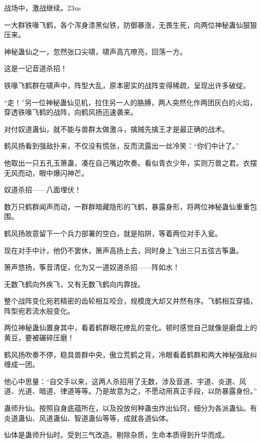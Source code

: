 
\begin{this_body}

战场中，激战继续。23us

一大群铁喙飞鹤，各个浑身漆黑似铁，防御暴涨，无畏生死，向两位神秘蛊仙狠狠压来。

神秘蛊仙之一，忽然张口尖啸，啸声高亢嘹亮，回荡一方。

这是一记音道杀招！

铁喙飞鹤群在啸声中，阵型大乱，原本密实的战阵变得稀疏，呈现出许多破绽。

“走！”另一位神秘蛊仙见机，拉住另一人的胳膊，两人突然化作两团灰白的火焰，穿透铁喙飞鹤的战阵，向鹤风扬迅速袭来。

对付奴道蛊仙，就不能与兽群太做激斗，擒贼先擒王才是最正确的战术。

鹤风扬看到强敌扑来，不仅没有慌张，反而流露出一丝冷笑：“你们中计了。”

他取出一只五孔玉箫蛊，凑在自己嘴边吹奏。看似青衣少年，实则万兽之君。衣摆无风而动，眼中爆闪神芒。

奴道杀招——八面埋伏！

数万只鹤群闻声而动，一群群暗藏隐形的飞鹤，暴露身形，将两位神秘蛊仙重重包围。

鹤风扬故意留下一个兵力部署的空白，就是陷阱，等着两位对手入瓮。

现在对手中计，他仍不罢休，箫声高扬上去，同时身上飞出三只五弦古筝蛊。

箫声悠扬，筝音清促，化为又一道奴道杀招——阵如水！

无数飞鹤向外疾飞，又有无数飞鹤向内靠拢。

整个战阵变化宛若精密的齿轮相互咬合，规模庞大却又井然有序。飞鹤相互穿插，阵型宛若流水般变化。

两位神秘蛊仙置身其中，看着鹤群眼花缭乱的变化。顿时感觉自己就像是磨盘上的黄豆，要被碾碎压磨！

鹤风扬吹奏不停，稳具兽群中央，傲立荒鹤之背，冷眼看着鹤群和两大神秘强敌纠缠成一团。

他心中思量：“自交手以来，这两人杀招用了无数，涉及音道、宇道、炎道、风道、光道、暗道、律道等等。乃是故意为之，不愿动用真正手段，以防暴露身份。”

蛊师升仙。按照自身底蕴所在，以及投放何种蛊虫炸出仙窍，细分为各派蛊仙。有炎道蛊仙、风道蛊仙、智道蛊仙等等，成就各道仙体。

仙体是蛊师升仙时。受到三气改造。剔除杂质，生命本质得到升华而成。


\end{this_body}
